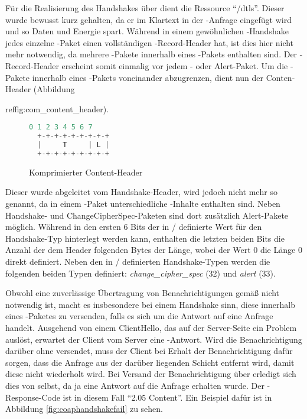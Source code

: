 Für die Realisierung des Handshakes über  dient die Ressource "`/dtls"'. Dieser  wurde bewusst kurz gehalten,
da er im Klartext in der -Anfrage eingefügt wird und so Daten und Energie spart. Während in einem gewöhnlichen -Handshake
jedes einzelne -Paket einen vollständigen -Record-Header hat, ist dies hier nicht mehr notwendig, da mehrere
-Pakete innerhalb eines -Pakets enthalten sind. Der -Record-Header erscheint somit einmalig vor jedem
- oder Alert-Paket. Um die -Pakete innerhalb eines -Pakets voneinander abzugrenzen, dient nun der
Conten-Header (Abbildung {ref{fig:com\_content\_header}).

\begin{figure}[ht]
  \centering
  \begin{lstlisting}[language=c]
   0 1 2 3 4 5 6 7
  +-+-+-+-+-+-+-+-+
  |     T     | L |
  +-+-+-+-+-+-+-+-+
  \end{lstlisting}
  \caption{Komprimierter Content-Header}
  \label{fig:com_content_header}
\end{figure}

Dieser wurde abgeleitet vom Handshake-Header, wird jedoch nicht mehr so genannt, da in einem -Paket unterschiedliche -Inhalte
enthalten sind. Neben Handshake- und ChangeCipherSpec-Paketen sind dort zusätzlich Alert-Pakete möglich. Während in den ersten 6 Bits der in
/ definierte Wert für den Handshake-Typ hinterlegt werden kann, enthalten die letzten beiden Bits die Anzahl der dem Header folgenden
Bytes der Länge, wobei der Wert 0 die Länge 0 direkt definiert. Neben den in / definierten Handshake-Typen werden die folgenden
beiden Typen definiert: \textit{change\_cipher\_spec} (32) und \textit{alert} (33).

Obwohl eine zuverlässige Übertragung von Benachrichtigungen gemäß  nicht notwendig ist, macht es insbesondere bei einem Handshake sinn, diese
innerhalb eines -Paketes zu versenden, falls es sich um die Antwort auf eine Anfrage handelt. Ausgehend von einem ClientHello, das
auf der Server-Seite ein Problem auslöst, erwartet der Client vom Server eine -Antwort. Wird die Benachrichtigung darüber ohne  versendet,
muss der Client bei Erhalt der Benachrichtigung dafür sorgen, dass die Anfrage aus der darüber liegenden  Schicht entfernt wird, damit diese
nicht wiederholt wird. Bei Versand der Benachrichtigung über  erledigt sich dies von selbst, da ja eine Antwort auf die Anfrage erhalten wurde.
Der -Response-Code ist in diesem Fall "`2.05 Content"'. Ein Beispiel dafür ist in Abbildung \ref{fig:coaphandshakefail} zu sehen.

}
